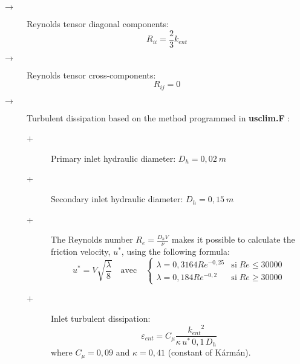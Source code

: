 \documentclass[a4paper,twoside,12pt]{article}
\begin{document}
\begin{itemize}
\begin{description}
\begin{description}
            \item[$\rightarrow$] Reynolds tensor diagonal components:
                  \begin{displaymath}
                     R_{ii} = \frac{2}{3} k_{ent}
                  \end{displaymath}

            \item[$\rightarrow$] Reynolds tensor cross-components:
                  \begin{displaymath}
                     R_{ij} = 0
                  \end{displaymath}

            \item[$\rightarrow$] Turbulent dissipation based on the method programmed in \textbf{usclim.F} :
                  \begin{description}
                     \item[+] Primary inlet hydraulic diameter: $D_h=0,02~m$
                     \item[+] Secondary inlet hydraulic diameter: $D_h=0,15~m$
                     \item[+] The Reynolds number
                           $\displaystyle{R_e=\frac{D_h V}{\nu}}$ makes it possible to calculate the friction velocity, $u^*$, using the following formula:
                           \begin{displaymath}
                              u^* = V \sqrt{\frac{\lambda}{8}} \quad \text{avec} \quad
                              \begin{cases}
                                 \displaystyle
                                 \lambda = 0,3164 Re^{-0,25} & \text{si} \; Re \leq 30000 \\
                                 \lambda = 0,184 Re^{-0,2}   & \text{si} \; Re \geq 30000
                              \end{cases}
                           \end{displaymath}
                     \item[+] Inlet turbulent dissipation:
                           \begin{displaymath}
                              \varepsilon_{ent} = C_{\mu} \frac{{k_{ent}}^2}{\kappa \, u^* \, 0,1 \, D_h}
                           \end{displaymath}
                           where $C_{\mu}=0,09$ and $\kappa=0,41$ (constant of K\'arm\'an).
                  \end{description}


\end{description}
\end{description}
\end{itemize}
\end{document}
